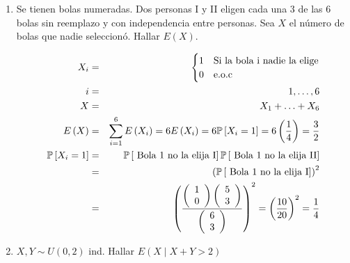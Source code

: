 \begin{enumerate}
\item Se tienen bolas numeradas. Dos personas I y II eligen cada una 3 de las 6 bolas sin reemplazo y con independencia entre personas. Sea $X$ el n\' umero de bolas que nadie seleccion\' o. Hallar $E \left(X \right)$.

\begin{eqnarray*}
X_{i} &=&\begin{cases}
1 & \textrm{Si la bola i nadie la elige}  \\
0 & \textrm{e.o.c}
\end{cases}\\
i&=&1,\ldots ,6\\
X&=& X_{1}+\ldots+ X_{6}\\
E\left(X \right) &=& \sum_{i=1}^{6} E\left(X_{i} \right)= 6 E\left(X_{i} \right) = 6 \mathbb{P} \left[X_{i} = 1 \right] = 6 \left(\frac{1}{4} \right) = \frac{3}{2}\\
\mathbb{P} \left[X_{i} = 1 \right]  &=& \mathbb{P} \left[ \textrm{ Bola 1 no la elija I} \right] \mathbb{P} \left[ \textrm{ Bola 1 no la elija II} \right]\\
&=& \left( \mathbb{P} \left[ \textrm{ Bola 1 no la elija I} \right]\right)^{2}\\
&=& \left(\dfrac{\left(\begin{array}{c} 
1\\
0
\end{array} \right)\left(\begin{array}{c} 
5\\
3
\end{array} \right) }{ \left(\begin{array}{c} 
6\\
3
\end{array} \right)} \right)^{2}= \left( \frac{10}{20}\right)^{2} = \frac{1}{4}
\end{eqnarray*}

\item $X,Y \sim U \left(0,2 \right)$ ind. Hallar $E \left(X \mid X+Y > 2 \right) $


\end{enumerate}
